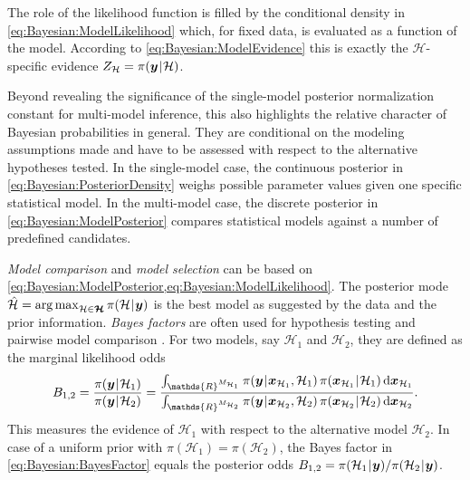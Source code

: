 The role of the likelihood function is filled by the conditional density in \cref{eq:Bayesian:ModelLikelihood} which, for fixed data, is evaluated as a function of the model.
According to \cref{eq:Bayesian:ModelEvidence} this is exactly the \(\mathcal{H}\)-specific evidence \(Z_\mathcal{H} = \pi(\bm{y} {\:\!}|{\:\!} \mathcal{H})\).
\par %
Beyond revealing the significance of the single-model posterior normalization constant for multi-model inference,
this also highlights the relative character of Bayesian probabilities in general.
They are conditional on the modeling assumptions made and have to be assessed with respect to the alternative hypotheses tested.
In the single-model case, the continuous posterior in \cref{eq:Bayesian:PosteriorDensity} weighs possible parameter values given one specific statistical model.
In the multi-model case, the discrete posterior in \cref{eq:Bayesian:ModelPosterior} compares statistical models against a number of predefined candidates.
\par %
\emph{Model comparison} and \emph{model selection} can be based on \cref{eq:Bayesian:ModelPosterior,eq:Bayesian:ModelLikelihood}.
The posterior mode \(\hat{\mathcal{H}} = \operatorname*{arg\,max}_{\mathcal{H} \in \bm{\mathcal{H}}} \pi(\mathcal{H} {\:\!}|{\:\!} \bm{y})\) is the best model
as suggested by the data and the prior information.
\emph{Bayes factors} are often used for hypothesis testing and pairwise model comparison \cite{Bayesian:Kass1993,Bayesian:Kass1995}.
For two models, say \(\mathcal{H}_1\) and \(\mathcal{H}_2\), they are defined as the marginal likelihood odds
\begin{equation} \label{eq:Bayesian:BayesFactor}
  B_{1,2} = \frac{\pi(\bm{y} \cond \mathcal{H}_1)}{\pi(\bm{y} \cond \mathcal{H}_2)}
  = \frac{\int_{\mathds{R}^{\dimParam_{\mathcal{H}_1}}} \pi(\bm{y} \cond \bm{x}_{\mathcal{H}_1},\mathcal{H}_1)
  \, \pi(\bm{x}_{\mathcal{H}_1} \cond \mathcal{H}_1) \, \mathrm{d} \bm{x}_{\mathcal{H}_1}}
  {\int_{\mathds{R}^{\dimParam_{\mathcal{H}_2}}} \pi(\bm{y} \cond \bm{x}_{\mathcal{H}_2},\mathcal{H}_2)
  \, \pi(\bm{x}_{\mathcal{H}_2} \cond \mathcal{H}_2) \, \mathrm{d} \bm{x}_{\mathcal{H}_2}}.
\end{equation}
This measures the evidence of \(\mathcal{H}_1\) with respect to the alternative model \(\mathcal{H}_2\).
In case of a uniform prior with \(\pi(\mathcal{H}_1) = \pi(\mathcal{H}_2)\),
the Bayes factor in \cref{eq:Bayesian:BayesFactor} equals the posterior odds \(B_{1,2} = \pi(\mathcal{H}_1 {\:\!}|{\:\!} \bm{y}) / \pi(\mathcal{H}_2 {\:\!}|{\:\!} \bm{y})\).
